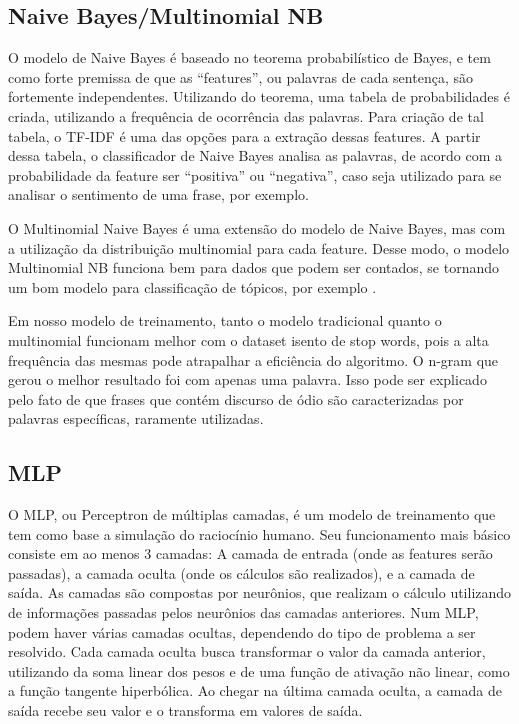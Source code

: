 \subsection{Naive Bayes/Multinomial NB}
O modelo de Naive Bayes é baseado no teorema probabilístico de Bayes, e tem como forte premissa de que as “features”, ou palavras de cada sentença, são fortemente independentes. Utilizando do teorema, uma tabela de probabilidades é criada, utilizando a frequência de ocorrência das palavras. Para criação de tal tabela, o TF-IDF é uma das opções para a extração dessas features. A partir dessa tabela, o classificador de Naive Bayes analisa as palavras, de acordo com a probabilidade da feature ser “positiva” ou “negativa”, caso seja utilizado para se analisar o sentimento de uma frase, por exemplo.

O Multinomial Naive Bayes é uma extensão do modelo de Naive Bayes, mas com a utilização da distribuição multinomial para cada feature. Desse modo, o modelo Multinomial NB funciona bem para dados que podem ser contados, se tornando um bom modelo para classificação de tópicos, por exemplo \cite{russel-ia}.

Em nosso modelo de treinamento, tanto o modelo tradicional quanto o multinomial funcionam melhor com o dataset isento de stop words, pois a alta frequência das mesmas pode atrapalhar a eficiência do algoritmo. O n-gram que gerou o melhor resultado foi com apenas uma palavra. Isso pode ser explicado pelo fato de que frases que contém discurso de ódio são caracterizadas por palavras específicas, raramente utilizadas.

\subsection{MLP}

O MLP, ou Perceptron de múltiplas camadas, é um modelo de treinamento que tem como base a simulação do raciocínio humano. Seu funcionamento mais básico consiste em ao menos 3 camadas: A camada de entrada (onde as features serão passadas), a camada oculta (onde os cálculos são realizados), e a camada de saída. As camadas são compostas por neurônios, que realizam o cálculo utilizando de informações passadas pelos neurônios das camadas anteriores. Num MLP, podem haver várias camadas ocultas, dependendo do tipo de problema a ser resolvido. Cada camada oculta busca transformar o valor da camada anterior, utilizando da soma linear dos pesos e de uma função de ativação não linear, como a função tangente hiperbólica. Ao chegar na última camada oculta, a camada de saída recebe seu valor e o transforma em valores de saída.


